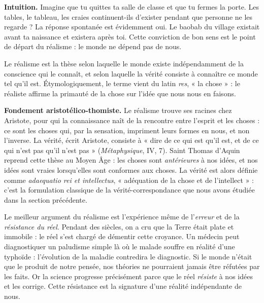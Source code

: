 \documentclass[11pt]{article}
\newcommand{\cle}[1]{{\popxbold\color{popdark}#1}}
\newcounter{popsec}
\newcounter{popsub}
\newcommand{\courssub}[1]{%
  \stepcounter{popsub}%
  \par\vspace{9pt}\noindent{\popxbold\fontsize{11.5}{13}\selectfont\color{popink}{\color{poporange}\thepopsec.\thepopsub}\hspace{6pt}#1}\par\nopagebreak\vspace{4pt}
}
\begin{document}
\courssub{Le réalisme : le monde existe sans nous}

\textbf{Intuition.} Imagine que tu quittes ta salle de classe et que tu fermes la porte. Les tables, le tableau, les craies continuent-ils d'exister pendant que personne ne les regarde ? La réponse spontanée est évidemment oui. Le baobab du village existait avant ta naissance et existera après toi. Cette conviction de bon sens est le point de départ du réalisme : le monde ne dépend pas de nous.

\begin{definition}[Le réalisme]
Le \cle{réalisme} est la thèse selon laquelle le monde existe indépendamment de la conscience qui le connaît, et selon laquelle la vérité consiste à connaître ce monde tel qu'il est. Étymologiquement, le terme vient du latin \emph{res}, « la chose » : le réaliste affirme la primauté de la chose sur l'idée que nous nous en faisons.
\end{definition}

\textbf{Fondement aristotélico-thomiste.} Le réalisme trouve ses racines chez Aristote, pour qui la connaissance naît de la rencontre entre l'esprit et les choses : ce sont les choses qui, par la sensation, impriment leurs formes en nous, et non l'inverse. La vérité, écrit Aristote, consiste à « dire de ce qui est qu'il est, et de ce qui n'est pas qu'il n'est pas » (\emph{Métaphysique}, IV, 7). Saint Thomas d'Aquin reprend cette thèse au Moyen Âge : les choses sont \emph{antérieures} à nos idées, et nos idées sont vraies lorsqu'elles sont conformes aux choses. La vérité est alors définie comme \emph{adaequatio rei et intellectus}, « adéquation de la chose et de l'intellect » : c'est la formulation classique de la vérité-correspondance que nous avons étudiée dans la section précédente.

\begin{exemplebox}
Le meilleur argument du réalisme est l'expérience même de l'\emph{erreur} et de la \emph{résistance du réel}. Pendant des siècles, on a cru que la Terre était plate et immobile : le réel s'est chargé de démentir cette croyance. Un médecin peut diagnostiquer un paludisme simple là où le malade souffre en réalité d'une typhoïde : l'évolution de la maladie contredira le diagnostic. Si le monde n'était que le produit de notre pensée, nos théories ne pourraient jamais être réfutées par les faits. Or la science progresse précisément parce que le réel \emph{résiste} à nos idées et les corrige. Cette résistance est la signature d'une réalité indépendante de nous.
\end{exemplebox}
\end{document}
